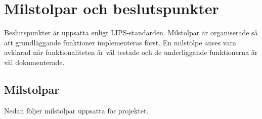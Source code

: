 \section{Milstolpar och beslutspunkter}
Beslutspunkter är uppsatta enligt LIPS-standarden. Milstolpar är organiserade så att grundläggande funktioner implementeras först. En milstolpe anses vara avklarad när funktionaliteten är väl testade och de underliggande funktionerna är väl dokumenterade.

\subsection{Milstolpar}
Nedan följer milstolpar uppsatta för projektet.
\begin{LIPSmilstolpar}

\end{LIPSmilstolpar}

